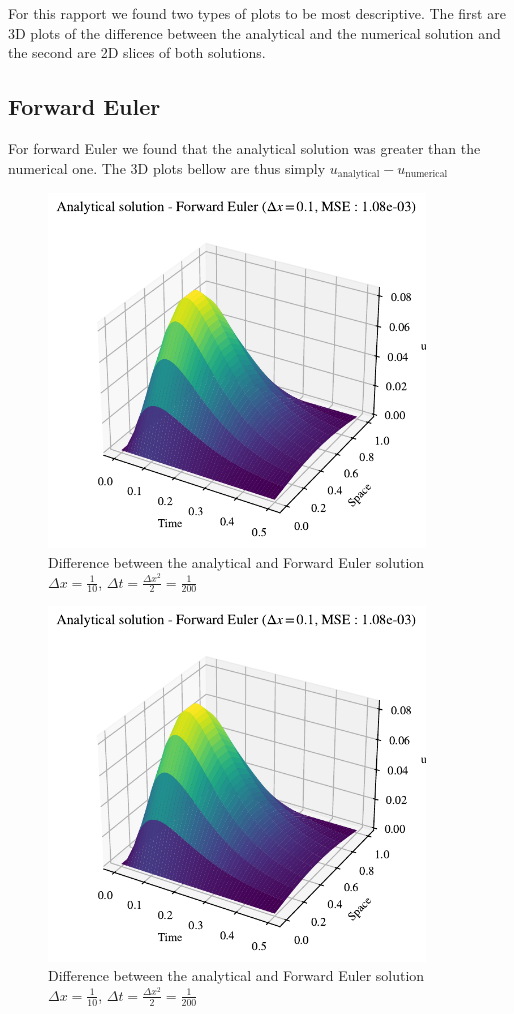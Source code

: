 \documentclass{article}
\theoremstyle{definition}
\begin{document}
For this rapport we found two types of plots to be most descriptive. The first are 3D plots of the difference between the analytical and the numerical solution and the second are 2D slices of both solutions. 

\subsection{Forward Euler}
For forward Euler we found that the analytical solution was greater than the numerical one.  The 3D plots bellow are thus simply $u_{\text{analytical}} - u_{\text{numerical}}$
\begin{figure}[H]%
    \centering
    \includegraphics[width=10cm]{Project3/figures/1dHeat/dx=0.1.pdf}
    \caption{Difference between the analytical and Forward Euler solution $\Delta x = \frac{1}{10}$, $\Delta t = \frac{\Delta x^2}{2} = \frac{1}{200} $}
    \label{fig:ForwardEulerdx=0.1}
\end{figure}


\begin{figure}[H]%
    \centering
    \includegraphics[width=10cm]{Project3/figures/1dHeat/dx=0.1.pdf}
    \caption{Difference between the analytical and Forward Euler solution $\Delta x = \frac{1}{10}$, $\Delta t = \frac{\Delta x^2}{2} = \frac{1}{200} $}
    \label{fig:ForwardEulerdx=0.1}
\end{figure}
\end{document}
